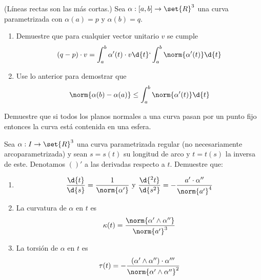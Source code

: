 \documentclass{homework}
\begin{document}
\begin{prob}
    (Líneas rectas son las más cortas.) Sea \(\alpha:[a,b]\rightarrow \set{R}^3\) una curva parametrizada con \(\alpha(a)=p\) y \(\alpha(b)=q\).
    \begin{enumerate}
        \item Demuestre que para cualquier vector unitario \(v\) se cumple
        \begin{equation*}
            (q-p)\cdot v=\int_a^b\alpha'(t)\cdot v\d{t}\lq\int_a^b\norm{\alpha'(t)}\d{t}
        \end{equation*}
        \item Use lo anterior para demostrar que
        \begin{equation*}
            \norm{\alpha(b)-\alpha(a)}\leq\int_a^b\norm{\alpha'(t)}\d{t}
        \end{equation*}
    \end{enumerate}
\end{prob}

\begin{sol}
    
\end{sol}


\begin{prob}
    Demuestre que si todos los planos normales a una curva pasan por un punto fijo entonces la curva está contenida en una esfera.
\end{prob}

\begin{sol}
    
\end{sol}


\begin{prob}
    Sea \(\alpha:I\rightarrow\set{R}^3\) una curva parametrizada regular (no necesariamente arcoparametrizada) y sean \(s=s(t)\) su longitud de arco y \(t=t(s)\) la inversa de este. Denotamos \(()'\) a las derivadas respecto a \(t\). Demuestre que:
    \begin{enumerate}
        \item \begin{equation*}
            \frac{\d{t}}{\d{s}}=\frac1{\norm{\alpha'}}\text{ y }\frac{\d{^2t}}{\d{s^2}}=-\frac{a'\cdot\alpha''}{\norm{a'}^4}
        \end{equation*}
        \item La curvatura de \(\alpha\) en \(t\) es
        \begin{equation*}
            \kappa(t)=\frac{\norm{\alpha'\wedge\alpha''}}{\norm{a'}^3}
        \end{equation*}
        \item La torsión de \(\alpha\) en \(t\) es
        \begin{equation*}
            \tau(t)=-\frac{(\alpha'\wedge\alpha'')\cdot\alpha'''}{\norm{\alpha'\wedge\alpha''}^2}
        \end{equation*}
    \end{enumerate}
\end{prob}
\end{document}
